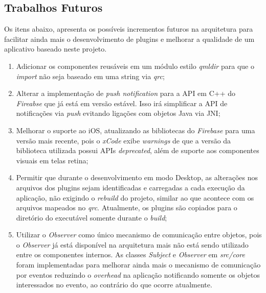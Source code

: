 \subsection{Trabalhos Futuros}
Os itens abaixo, apresenta os possíveis incrementos futuros na arquitetura para facilitar ainda mais o desenvolvimento de plugins e melhorar a qualidade de um aplicativo baseado neste projeto.

\begin{enumerate}
	\item Adicionar os componentes reusáveis em um módulo estilo \textit{qmldir} para que o \textit{import} não seja baseado em uma string via \textit{qrc};

	\item Alterar a implementação de \textit{push notification} para a API em C++ do \textit{Fireabse} que já está em versão estável. Isso irá simplificar a API de notificações via \textit{push} evitando ligações com objetos Java via JNI;

	\item Melhorar o suporte ao iOS, atualizando as bibliotecas do \textit{Firebase} para uma versão mais recente, pois o \textit{xCode} exibe \textit{warnings} de que a versão da biblioteca utilizada possui APIs \textit{deprecated}, além de suporte aos componentes visuais em telas retina;

	\item Permitir que durante o desenvolvimento em modo Desktop, as alterações nos arquivos dos plugins sejam identificadas e carregadas a cada execução da aplicação, não exigindo o \textit{rebuild} do projeto, similar ao que acontece com os arquivos mapeados no \textit{qrc}. Atualmente, os plugins são copiados para o diretório do executável somente durante o \textit{build};

	\item Utilizar o \textit{Observer} como único mecanismo de comunicação entre objetos, pois o \textit{Observer} já está disponível na arquitetura mais não está sendo utilizado entre os componentes internos. As classes \textit{Subject} e \textit{Observer} em \textit{src/core} foram implementadas para melhorar ainda mais o mecanismo de comunicação por eventos reduzindo o \textit{overhead} na aplicação notificando somente os objetos interessados no evento, ao contrário do que ocorre atualmente.
\end{enumerate}